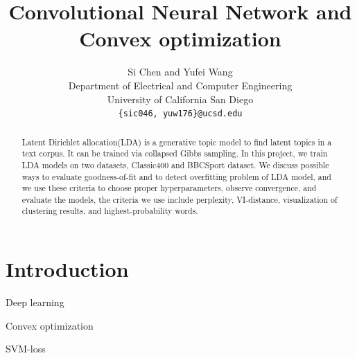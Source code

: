 \documentclass{article} %
\title{Convolutional Neural Network and Convex optimization}
\author{
Si Chen  and   Yufei Wang\\
Department of Electrical and Computer Engineering\\
University of California San Diego\\
\texttt{\{sic046, yuw176\}@ucsd.edu}          \\
}
\begin{document}
\maketitle
\begin{abstract}
Latent Dirichlet allocation(LDA) is a generative topic model to find latent topics in a text corpus. It can be trained via collapsed Gibbs sampling. In this project, we train LDA models on two datasets, Classic400 and BBCSport dataset. We discuss possible ways to evaluate goodness-of-fit and to detect overfitting problem of LDA model, and we use these criteria to choose proper hyperparameters, observe convergence, and evaluate the models, the criteria we use include perplexity, VI-distance, visualization of clustering results, and highest-probability words. 

\end{abstract}
\section{Introduction}

Deep learning


Convex optimization


SVM-loss



\par
\end{document}
